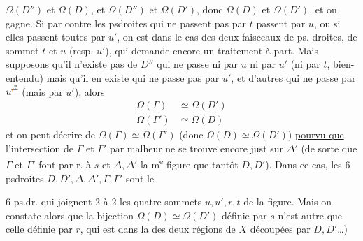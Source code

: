  $\Omega(D'')$  et $\Omega(D)$, et $\Omega(D'')$ et $\Omega(D')$, donc
$\Omega(D)$ et $\Omega(D')$, et on gagne. Si par contre
 les psdroites qui ne passent pas par $t$ passent
par $u$, ou si elles passent toutes par $u'$, on est
dans le cas des deux faisceaux de ps. droites,
de sommet $t$ et $u$ (resp. $u'$), qui demande
encore un traitement à part. Mais supposons
qu'il n'existe pas de $D''$ qui ne passe ni par
$u$ ni par $u'$ (ni par $t$, bien-entendu) mais
qu'il en existe  qui ne passe pas par $u'$,  et d'autres qui ne passe par $u^{\deleted{\unsure{\prime}}}$ (mais par $u'$), alors
\[
\begin{aligned}
\Omega(\Gamma)&\simeq\Omega(D')\\
\Omega(\Gamma')&\simeq\Omega(D)
\end{aligned}
\]
et on peut décrire de  $\Omega(\Gamma)\simeq\Omega(\Gamma')$
(donc $\Omega(D)\simeq\Omega(D')$) \uline{pourvu que} l'intersection  de $\Gamma$ et $\Gamma'$
par malheur ne se trouve encore just
sur $\Delta'$ (de sorte que $\Gamma$ et $\Gamma'$ font par r. à $s$
et $\Delta,\Delta'$ la m\textsuperscript{e} figure que tantôt $D,D'$).
Dans ce cas, les 6 psdroites $D,D',\Delta,\Delta',\Gamma,\Gamma'$ sont le

6 ps.dr. qui joignent 2 à 2 les quatre sommets
$u,u',r,t$ de la figure. Mais on constate alors que
la bijection  $\Omega(D)\simeq\Omega(D')$ définie par $s$ n'est autre
que celle définie par $r$, qui est dans la 
des deux régions de $X$ découpées par $D,D'$\ldots)

